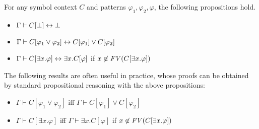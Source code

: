 \documentclass{amsart}
\begin{document}
\begin{proposition}
\label{prop_propgation_of_symbol_application}
For any symbol context $C$ and patterns $\varphi_1, \varphi_2, \varphi$,
the following propositions hold.
\begin{itemize}
	\item $\Gamma \vdash 
	          C[\bot] \leftrightarrow 
	          \bot$
	\item $\Gamma \vdash 
	          C[\varphi_1 \vee \varphi_2] \leftrightarrow
	          C[\varphi_1] \vee
	          C[\varphi_2]$
	\item $\Gamma \vdash
	          C[\exists x . \varphi] \leftrightarrow
	          \exists x . C[\varphi] $
	       \quad if $x \not\in \mathit{FV}(C[\exists x . \varphi])$
\end{itemize}
The following results are often useful in practice, whose proofs can
be obtained by standard propositional reasoning with the above propositions:
\begin{itemize}
	\item $\Gamma \vdash 
	          C[\varphi_1 \vee \varphi_2]$
	      iff
	      $\Gamma \vdash C[\varphi_1] \vee
	                     C[\varphi_2]$
	\item $\Gamma \vdash
	          C[\exists x . \varphi] $
	      iff
	      $\Gamma \vdash \exists x . C[\varphi]$
	      \quad if $x \not\in \mathit{FV}(C[\exists x . \varphi])$
\end{itemize}
\end{proposition}
\end{document}
